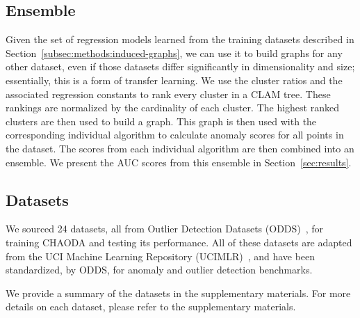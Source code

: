 \subsection{Ensemble}\label{subsec:methods:ensemble}
Given the set of regression models learned from the training datasets described in Section~\ref{subsec:methods:induced-graphs}, we can use it to build graphs for any other dataset, even if those datasets differ significantly in dimensionality and size; essentially, this is a form of transfer learning.
We use the cluster ratios and the associated regression constants to rank every cluster in a CLAM tree.
These rankings are normalized by the cardinality of each cluster.
The highest ranked clusters are then used to build a graph.
This graph is then used with the corresponding individual algorithm to calculate anomaly scores for all points in the dataset.
The scores from each individual algorithm are then combined into an ensemble.
We present the AUC scores from this ensemble in Section~\ref{sec:results}.



\subsection{Datasets}\label{subsec:methods:datasets}

We sourced 24 datasets, all from Outlier Detection Datasets (ODDS)~\cite{rayana2016odds}, for training CHAODA and testing its performance.
All of these datasets are adapted from the UCI Machine Learning Repository (UCIMLR)~\cite{UCIMLR}, and have been standardized, by ODDS, for anomaly and outlier detection benchmarks.

We provide a summary of the datasets in the supplementary materials.
For more details on each dataset, please refer to the supplementary materials.



